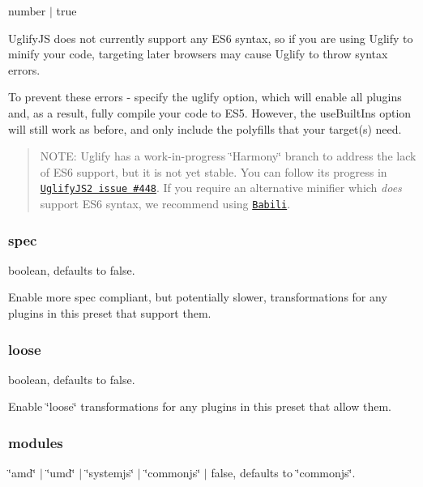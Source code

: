 {\ttfamily number $\vert$ true}

Uglify\+JS does not currently support any E\+S6 syntax, so if you are using Uglify to minify your code, targeting later browsers may cause Uglify to throw syntax errors.

To prevent these errors -\/ specify the uglify option, which will enable all plugins and, as a result, fully compile your code to E\+S5. However, the {\ttfamily use\+Built\+Ins} option will still work as before, and only include the polyfills that your target(s) need.

\begin{quote}
N\+O\+TE\+: Uglify has a work-\/in-\/progress \char`\"{}\+Harmony\char`\"{} branch to address the lack of E\+S6 support, but it is not yet stable. You can follow its progress in \href{https://github.com/mishoo/UglifyJS2/issues/448}{\tt Uglify\+J\+S2 issue \#448}. If you require an alternative minifier which {\itshape does} support E\+S6 syntax, we recommend using \href{https://github.com/babel/babili}{\tt Babili}. \end{quote}


\subsubsection*{{\ttfamily spec}}

{\ttfamily boolean}, defaults to {\ttfamily false}.

Enable more spec compliant, but potentially slower, transformations for any plugins in this preset that support them.

\subsubsection*{{\ttfamily loose}}

{\ttfamily boolean}, defaults to {\ttfamily false}.

Enable \char`\"{}loose\char`\"{} transformations for any plugins in this preset that allow them.

\subsubsection*{{\ttfamily modules}}

{\ttfamily \char`\"{}amd\char`\"{} $\vert$ \char`\"{}umd\char`\"{} $\vert$ \char`\"{}systemjs\char`\"{} $\vert$ \char`\"{}commonjs\char`\"{} $\vert$ false}, defaults to {\ttfamily \char`\"{}commonjs\char`\"{}}.

